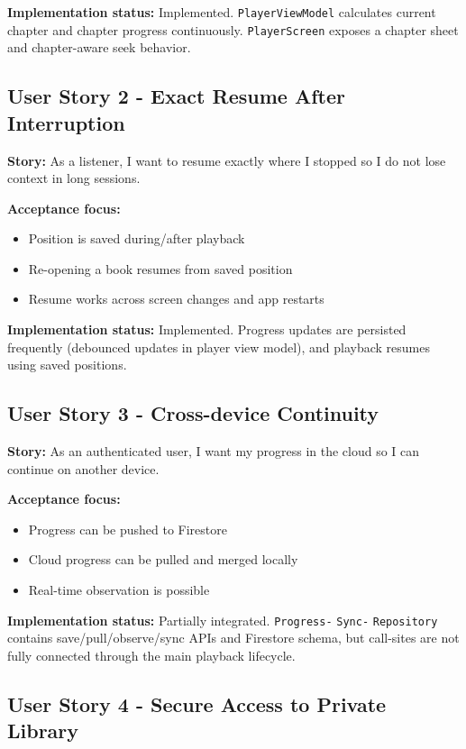 \documentclass[11pt,a4paper]{article}
\begin{document}
\textbf{Implementation status:} Implemented. \texttt{PlayerViewModel} calculates current chapter and chapter progress continuously. \texttt{PlayerScreen} exposes a chapter sheet and chapter-aware seek behavior.

\subsection{User Story 2 - Exact Resume After Interruption}

\textbf{Story:} As a listener, I want to resume exactly where I stopped so I do not lose context in long sessions.

\textbf{Acceptance focus:}
\begin{itemize}[noitemsep]
    \item Position is saved during/after playback
    \item Re-opening a book resumes from saved position
    \item Resume works across screen changes and app restarts
\end{itemize}

\textbf{Implementation status:} Implemented. Progress updates are persisted frequently (debounced updates in player view model), and playback resumes using saved positions.

\subsection{User Story 3 - Cross-device Continuity}

\textbf{Story:} As an authenticated user, I want my progress in the cloud so I can continue on another device.

\textbf{Acceptance focus:}
\begin{itemize}[noitemsep]
    \item Progress can be pushed to Firestore
    \item Cloud progress can be pulled and merged locally
    \item Real-time observation is possible
\end{itemize}

\textbf{Implementation status:} Partially integrated. \texttt{Progress-} \texttt{Sync-} \texttt{Repository} contains save/pull/observe/sync APIs and Firestore schema, but call-sites are not fully connected through the main playback lifecycle.

\subsection{User Story 4 - Secure Access to Private Library}
\end{document}

